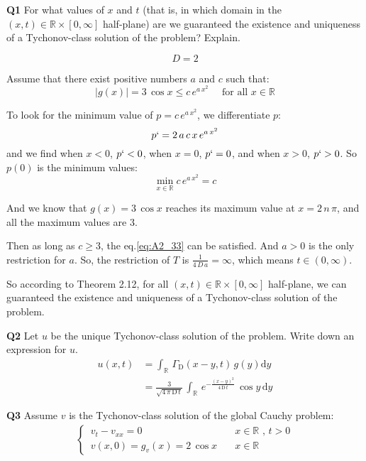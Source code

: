 \documentclass[../main.tex]{subfiles}
\begin{document}
\textbf{Q1}  For what values of $x$ and $t$ (that is, in which domain in the $(x,t) \in \mathbb{R} \times [0,\infty]$ half-plane) are we guaranteed the existence and uniqueness of a Tychonov-class solution of the problem? Explain.

\begin{equation}
    D = 2
\end{equation}

Assume that there exist positive numbers $a$ and $c$ such that:
\begin{equation} \label{eq:A2_33}
    |g(x)| = 3 \, \cos{x} \leqslant c \, e^{a \, x^2} \quad \text{ for all  } x \in \mathbb{R}
\end{equation}

To look for the minimum value of $p = c \, e^{a \, x^2}$, we differentiate $p$:
\begin{equation}
    p` = 2 \, a \, c \, x \, e^{a \, x^2}
\end{equation}
and we find when $x < 0$, $p` < 0$, when $x = 0$, $p` = 0$, and when $x > 0$, $p` > 0$. So $p(0)$ is the minimum values:
\begin{equation}
    \min_{x \in \mathbb{R}} c \, e^{a \, x^2} = c
\end{equation}

And we know that $g(x) = 3 \, \cos{x}$ reaches its maximum value at $x = 2 \, n \, \pi$, and all the maximum values are 3.

Then as long as $c \geqslant 3$, the eq.\ref{eq:A2_33} can be satisfied. And $a > 0$ is the only restriction for $a$. So, the restriction of $T$ is $\frac{1}{4 \, D \, a} = \infty$, which means $t \in (0,\infty)$.

So according to Theorem 2.12, for all $(x,t) \in \mathbb{R} \times [0,\infty]$ half-plane, we can guaranteed the existence and uniqueness of a Tychonov-class solution of the problem.

\textbf{Q2}  Let $u$ be the unique Tychonov-class solution of the problem. Write down an expression for $u$.
\begin{align}
    u(x,t) &= \int_{\mathbb{R}} \, \Gamma_\mathrm{D}(x-y,t) \, g(y) \mathrm{d} y \\
           &= \frac{3}{\sqrt{4 \, \pi \, \mathrm{D} \, t}} \, \int_{\mathbb{R}} \, e^{- \frac{(x-y)^2}{4 \,  \mathrm{D} \, t}} \, \cos{y} \, \mathrm{d} y 
\end{align}

\textbf{Q3}  Assume $v$ is the Tychonov-class solution of the global Cauchy problem:
\begin{align}
   \begin{cases}
        \, v_t - v_{xx} = 0 \quad & x \in \mathbb{R} \text{ ,  } t > 0 \\
        \, v(x,0) = g_v(x) = 2 \, \cos{x} \quad & x \in \mathbb{R}
    \end{cases}
\end{align}
\end{document}

